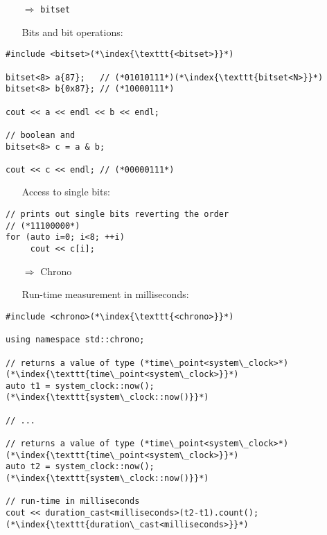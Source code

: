 \documentclass[10pt]{book}
\begin{document}
\begin{enumerate}
\item[$\Rightarrow$] \texttt{bitset}
\end{enumerate}
\begin{enumerate}
\item[] Bits and bit operations:
\end{enumerate}
\begin{lstlisting}
#include <bitset>(*\index{\texttt{<bitset>}}*)

bitset<8> a{87};   // (*01010111*)(*\index{\texttt{bitset<N>}}*)
bitset<8> b{0x87}; // (*10000111*)
    
cout << a << endl << b << endl;
    
// boolean and
bitset<8> c = a & b;
    
cout << c << endl; // (*00000111*)
\end{lstlisting}
\begin{enumerate}
\item[] Access to single bits:
\end{enumerate}
\begin{lstlisting}
// prints out single bits reverting the order
// (*11100000*)
for (auto i=0; i<8; ++i)
     cout << c[i];
\end{lstlisting}
\begin{enumerate}
\item[$\Rightarrow$] Chrono
\end{enumerate}
\begin{enumerate}
\item[] Run-time measurement in milliseconds:
\end{enumerate}
\begin{lstlisting}
#include <chrono>(*\index{\texttt{<chrono>}}*)

using namespace std::chrono;

// returns a value of type (*time\_point<system\_clock>*)(*\index{\texttt{time\_point<system\_clock>}}*)
auto t1 = system_clock::now();(*\index{\texttt{system\_clock::now()}}*)

// ...

// returns a value of type (*time\_point<system\_clock>*)(*\index{\texttt{time\_point<system\_clock>}}*)
auto t2 = system_clock::now();(*\index{\texttt{system\_clock::now()}}*)

// run-time in milliseconds
cout << duration_cast<milliseconds>(t2-t1).count();(*\index{\texttt{duration\_cast<milliseconds>}}*)
\end{lstlisting}
\end{document}
